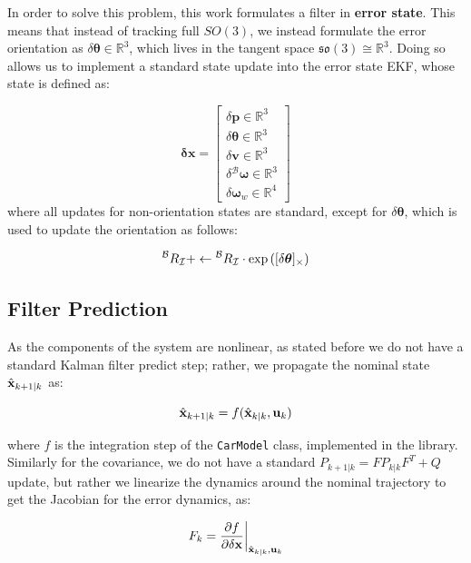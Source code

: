 In order to solve this problem, this work formulates a filter in \textbf{error state}. This means that instead of tracking full $SO(3)$, we instead formulate the error orientation as $\delta \boldsymbol{\theta} \in \mathbb{R}^3$, which lives in the tangent space $\mathfrak{so}(3) \cong \mathbb{R}^3$. Doing so allows us to implement a standard state update into the error state EKF, whose state is defined as:  

$$
\mathbf{\delta x} =
\begin{bmatrix}
  \delta \mathbf{p} \in \mathbb{R}^3 \\
  \delta \boldsymbol{\theta} \in \mathbb{R}^3 \\
  \delta \mathbf{v} \in \mathbb{R}^3 \\
  \delta {}^\mathcal{B}\boldsymbol{\omega} \in \mathbb{R}^3 \\
  \delta \boldsymbol{\omega}_w \in \mathbb{R}^4
\end{bmatrix}
$$
where all updates for non-orientation states are standard, except for $\delta \boldsymbol{\theta}$, which is used to update the orientation as follows:

\begin{equation}
  {}^\mathcal{B}{R}_\mathcal{I}+ \leftarrow {}^\mathcal{B}{R}_\mathcal{I} \cdot \exp\left([\delta \boldsymbol{\theta}]_\times\right)
\end{equation}

\subsection{Filter Prediction}

As the components of the system are nonlinear, as stated before we do not have a standard Kalman filter predict step; rather, we propagate the nominal state $\hat{\mathbf{x}}_{k+1|k}$ as:

\begin{equation}
  \hat{\mathbf{x}}_{k+1|k} = f(\hat{\mathbf{x}}_{k|k}, \mathbf{u}_k)
\end{equation}

where $f$ is the integration step of the \texttt{CarModel} class, implemented in the library. Similarly for the covariance, we do not have a standard $P_{k+1|k} = F P_{k|k} F^T + Q$ update, but rather we linearize the dynamics around the nominal trajectory to get the Jacobian for the error dynamics, as:

\begin{equation}
  F_k = \frac{\partial f}{\partial \delta \mathbf{x}} \biggr|_{\hat{\mathbf{x}}_{k|k}, \mathbf{u}_k}
\end{equation}

